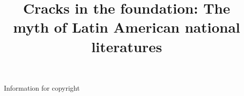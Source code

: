\documentclass[12pt]{report}\usepackage[]{graphicx}\usepackage[]{color}
\title{Cracks in the foundation: The myth of Latin American national literatures}
\makeatletter
\newcommand\iraggedright{%
	\let\\\@centercr\@rightskip\@flushglue \rightskip\@rightskip
	\leftskip\z@skip}
\makeatother
\begin{document}

%		
%		



	

\iraggedright
{}
\begin{spacing}{1.9}
	








Information for copyright

\nocite{Carrasquilla1896}
\nocite{Lizardi1884}
\nocite{Galdos1873}
\nocite{Gomez1841}
\nocite{Hernandez1897}
\nocite{Isaacs1894}
\nocite{Marmol1877}
\nocite{Mitre1847}
\nocite{Palacios1886}
\nocite{Samper1867}


\makeworkscited
\end{spacing}
\end{document}
